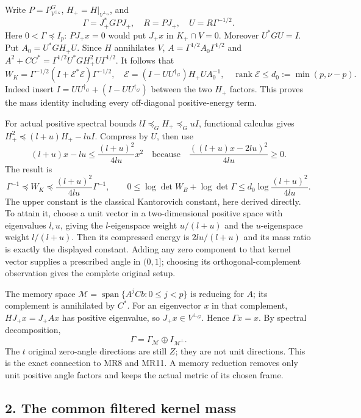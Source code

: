 \documentclass[11pt]{article}
\begin{document}
Write \(P=P_{V^{\perp_G}}^G\), \(H_+=H|_{V^{\perp_G}}\), and \[
 \Gamma=J_+^*GPJ_+,\quad R=PJ_+,\quad U=R\Gamma^{-1/2}.
\] Here \(0<\Gamma\preceq I_p\): \(PJ_+x=0\) would put \(J_+x\) in \(K_+\cap V=0\). Moreover \(U^*GU=I\). Put \(A_0=U^*GH_+U\). Since \(H\) annihilates \(V\), \(A=\Gamma^{1/2}A_0\Gamma^{1/2}\) and \(A^2+CC^*=\Gamma^{1/2}U^*GH_+^2U\Gamma^{1/2}\). It follows that \[
 W_K=\Gamma^{-1/2}(I+\mathcal E^*\mathcal E)\Gamma^{-1/2},
 \quad \mathcal E=(I-UU^{\dagger_G})H_+UA_0^{-1},
 \quad \operatorname{rank}\mathcal E\le d_0:=\min(p,\nu-p).
 \tag{KM4}
\] Indeed insert \(I=UU^{\dagger_G}+(I-UU^{\dagger_G})\) between the two \(H_+\) factors. This proves the mass identity including every off-diagonal positive-energy term.

For actual positive spectral bounds \(lI\preceq_G H_+\preceq_G uI\), functional calculus gives \(H_+^2\preceq(l+u)H_+-luI\). Compress by \(U\), then use \[
 (l+u)x-lu\le \frac{(l+u)^2}{4lu}x^2
 \quad\text{because}\quad
 \frac{((l+u)x-2lu)^2}{4lu}\ge0.
\] The result is \[
 \Gamma^{-1}\preceq W_K\preceq
 \frac{(l+u)^2}{4lu}\Gamma^{-1},\qquad
 0\le\log\det W_B+\log\det\Gamma
 \le d_0\log\frac{(l+u)^2}{4lu}.
 \tag{KM5}
\] The upper constant is the classical Kantorovich constant, here derived directly. To attain it, choose a unit vector in a two-dimensional positive space with eigenvalues \(l,u\), giving the \(l\)-eigenspace weight \(u/(l+u)\) and the \(u\)-eigenspace weight \(l/(l+u)\). Then its compressed energy is \(2lu/(l+u)\) and its mass ratio is exactly the displayed constant. Adding any zero component to that kernel vector supplies a prescribed angle in \((0,1]\); choosing its orthogonal-complement observation gives the complete original setup.

The memory space \(\mathcal M=\operatorname{span}\{A^jCb:0\le j<p\}\) is reducing for \(A\); its complement is annihilated by \(C^*\). For an eigenvector \(x\) in that complement, \(HJ_+x=J_+Ax\) has positive eigenvalue, so \(J_+x\in V^{\perp_G}\). Hence \(\Gamma x=x\). By spectral decomposition, \[
 \Gamma=\Gamma_{\mathcal M}\oplus I_{\mathcal M^\perp}.
 \tag{KM6}
\] The \(t\) original zero-angle directions are still \(Z\); they are not unit directions. This is the exact connection to MR8 and MR11. A memory reduction removes only unit positive angle factors and keeps the actual metric of its chosen frame.

\subsection{2. The common filtered kernel mass}\label{the-common-filtered-kernel-mass}
\end{document}
